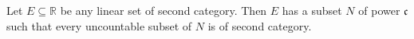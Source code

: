 Let $E \subseteq \mathbb{R}$ be any linear set of second category. Then $E$ has a subset $N$ of power $\mathfrak{c}$ such that every uncountable subset of $N$ is of second category.

